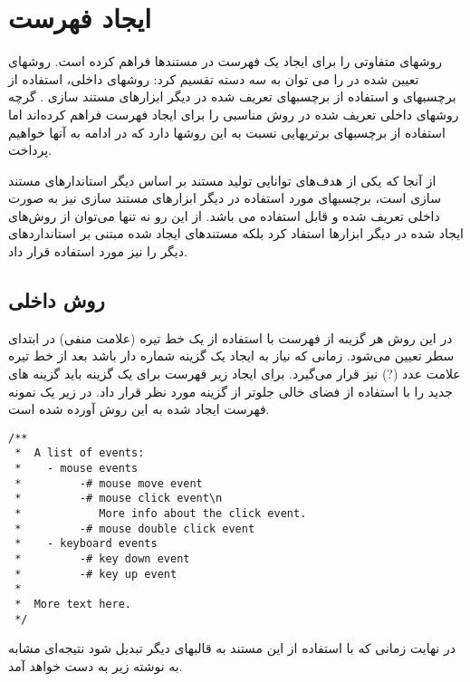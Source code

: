 \chapter{ایجاد فهرست}

 روشهای متفاوتی را برای ایجاد یک فهرست در مستندها فراهم کرده است.
روشهای تعیین شده در  را می توان به سه دسته تقسیم کرد: روشهای داخلی،
استفاده از برچسبهای  و استفاده از برچسبهای تعریف شده در دیگر ابزارهای
مستند سازی . گرچه روشهای داخلی تعریف شده در  روش مناسبی را برای
ایجاد فهرست فراهم کرده‌اند اما استفاده از برچسبهای  برتریهایی نسبت به
این روشها دارد که در ادامه به آنها خواهیم پرداخت.

از آنجا که یکی از هدف‌های  توانایی تولید مستند بر اساس دیگر
استاندارهای مستند سازی است، برچسبهای مورد استفاده در دیگر ابزارهای مستند سازی
نیز به صورت داخلی تعریف شده و قابل استفاده می باشد. از این رو نه تنها می‌توان از
روش‌های ایجاد شده در دیگر ابزارها استفاد کرد بلکه مستند‌های ایجاد شده مبتنی بر
استانداردهای دیگر را نیز مورد استفاده قرار داد.

\section{روش داخلی}

در این روش هر گزینه از فهرست با استفاده از یک خط تیره (علامت منفی) در ابتدای سطر
تعیین می‌شود. زمانی که نیاز به ایجاد یک گزینه شماره دار باشد بعد از خط تیره
علامت عدد (?) نیز قرار می‌گیرد. برای ایجاد زیر فهرست برای یک گزینه باید گزینه
های جدید را با استفاده از فضای خالی جلوتر از گزینه مورد نظر قرار داد.
در زیر یک نمونه فهرست ایجاد شده به این روش آورده شده است.

\begin{latin}
\lstset{language=C++}  
\begin{lstlisting}[frame=single] 
/**
 *  A list of events:
 *    - mouse events
 *         -# mouse move event
 *         -# mouse click event\n
 *            More info about the click event.
 *         -# mouse double click event
 *    - keyboard events
 *         -# key down event
 *         -# key up event
 *
 *  More text here.
 */
\end{lstlisting}
\end{latin}

در نهایت زمانی که با استفاده از  این مستند به قالبهای دیگر تبدیل شود
نتیجه‌ای مشابه به نوشته زیر به دست خواهد آمد.

